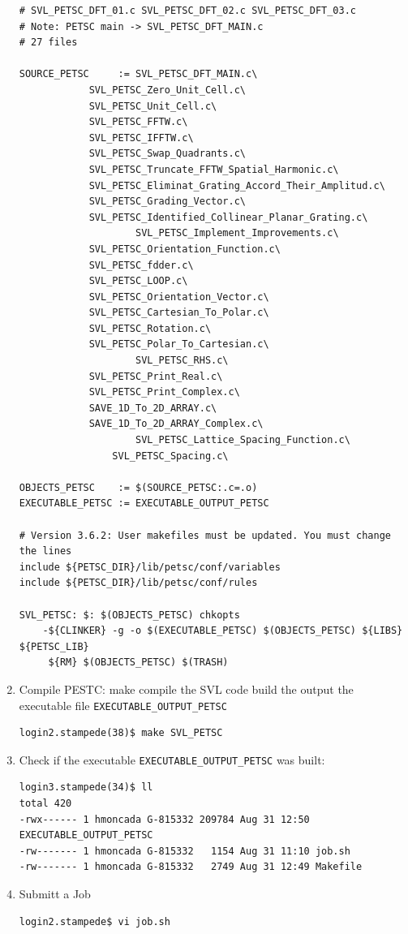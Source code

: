 \documentclass{article}
\begin{document}
\begin{enumerate}
\begin{verbatim}
# SVL_PETSC_DFT_01.c SVL_PETSC_DFT_02.c SVL_PETSC_DFT_03.c
# Note: PETSC main -> SVL_PETSC_DFT_MAIN.c
# 27 files

SOURCE_PETSC     := SVL_PETSC_DFT_MAIN.c\
		    SVL_PETSC_Zero_Unit_Cell.c\
		    SVL_PETSC_Unit_Cell.c\
		    SVL_PETSC_FFTW.c\
		    SVL_PETSC_IFFTW.c\
		    SVL_PETSC_Swap_Quadrants.c\
		    SVL_PETSC_Truncate_FFTW_Spatial_Harmonic.c\
		    SVL_PETSC_Eliminat_Grating_Accord_Their_Amplitud.c\
 		    SVL_PETSC_Grading_Vector.c\
		    SVL_PETSC_Identified_Collinear_Planar_Grating.c\
                    SVL_PETSC_Implement_Improvements.c\
		    SVL_PETSC_Orientation_Function.c\
		    SVL_PETSC_fdder.c\
		    SVL_PETSC_LOOP.c\
		    SVL_PETSC_Orientation_Vector.c\
		    SVL_PETSC_Cartesian_To_Polar.c\
		    SVL_PETSC_Rotation.c\
		    SVL_PETSC_Polar_To_Cartesian.c\
                    SVL_PETSC_RHS.c\
		    SVL_PETSC_Print_Real.c\
		    SVL_PETSC_Print_Complex.c\
		    SAVE_1D_To_2D_ARRAY.c\
		    SAVE_1D_To_2D_ARRAY_Complex.c\
                    SVL_PETSC_Lattice_Spacing_Function.c\
	            SVL_PETSC_Spacing.c\

OBJECTS_PETSC    := $(SOURCE_PETSC:.c=.o)
EXECUTABLE_PETSC := EXECUTABLE_OUTPUT_PETSC

# Version 3.6.2: User makefiles must be updated. You must change the lines
include ${PETSC_DIR}/lib/petsc/conf/variables
include ${PETSC_DIR}/lib/petsc/conf/rules

SVL_PETSC: $: $(OBJECTS_PETSC) chkopts
	-${CLINKER} -g -o $(EXECUTABLE_PETSC) $(OBJECTS_PETSC) ${LIBS} ${PETSC_LIB} 
	 ${RM} $(OBJECTS_PETSC) $(TRASH)
\end{verbatim}
\normalsize

\item  Compile PESTC: make compile the SVL code build the output the executable file \verb+EXECUTABLE_OUTPUT_PETSC+
\scriptsize
\begin{verbatim}
login2.stampede(38)$ make SVL_PETSC
\end{verbatim}
\normalsize
\item  Check if the executable \verb+EXECUTABLE_OUTPUT_PETSC+ was built:
\scriptsize
\begin{verbatim}
login3.stampede(34)$ ll
total 420
-rwx------ 1 hmoncada G-815332 209784 Aug 31 12:50 EXECUTABLE_OUTPUT_PETSC
-rw------- 1 hmoncada G-815332   1154 Aug 31 11:10 job.sh
-rw------- 1 hmoncada G-815332   2749 Aug 31 12:49 Makefile
\end{verbatim}
\normalsize
\item  Submitt a Job
\scriptsize
\begin{verbatim}
login2.stampede$ vi job.sh 


\end{verbatim}
\end{enumerate}
\end{document}
